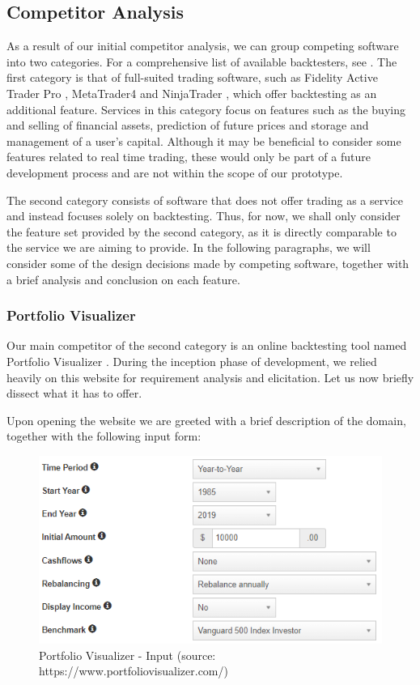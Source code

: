 \documentclass[main.tex]{subfiles}
\begin{document}
\subsection{Competitor Analysis}

As a result of our initial competitor analysis, we can group competing software into two categories. For a comprehensive list of available backtesters, see \cite{listofbacktesters}. The first category is that of full-suited trading software, such as Fidelity Active Trader Pro \cite{Fidelity}, MetaTrader4 \cite{MetaTrader} and NinjaTrader \cite{NinjaTrader}, which offer backtesting as an additional feature. Services in this category focus on features such as the buying and selling of financial assets, prediction of future prices and storage and management of a user's capital. Although it may be beneficial to consider some features related to real time trading, these would only be part of a future development process and are not within the scope of our prototype.

The second category consists of software that does not offer trading as a service and instead focuses solely on backtesting. Thus, for now, we shall only consider the feature set provided by the second category, as it is directly comparable to the service we are aiming to provide. In the following paragraphs, we will consider some of the design decisions made by competing software, together with a brief analysis and conclusion on each feature.

\subsubsection{Portfolio Visualizer}
Our main competitor of the second category is an online backtesting tool named Portfolio Visualizer \cite{portfoliovis}. During the inception phase of development, we relied heavily on this website for requirement analysis and elicitation. Let us now briefly dissect what it has to offer. 

Upon opening the website we are greeted with a brief description of the domain, together with the following input form:

\begin{figure}[H]
   \centering
   \includegraphics[scale=0.8]{02Background/02Pictures/portfolio_visualizer_input_1.png}
   \caption{Portfolio Visualizer - Input (source: https://www.portfoliovisualizer.com/)}
\end{figure}
\end{document}
